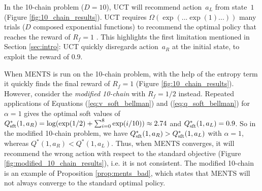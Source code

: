 \documentclass{article}
\newcommand{\Qss}[2]{Q^*_{\textnormal{sft}}(#1,#2)}
\theoremstyle{plain}
\begin{document}
	In the 10-chain problem ($D=10$), UCT will recommend action~$a_L$ from state~$1$ (Figure \ref{fig:10_chain_results}). UCT requires $\Omega(\exp(...\exp(1)...))$ many trials ($D$ composed exponential functions) to recommend the optimal policy that reaches the reward of $R_f=1$ \cite{coquelin2007_uct}. This highlights the first limitation mentioned in Section \ref{sec:intro}: UCT quickly disregards action~$a_R$ at the initial state, to exploit the reward of $0.9$.%

    When MENTS is run on the 10-chain problem, with the help of the entropy term it quickly finds the final reward of $R_f=1$ %
    (Figure \ref{fig:10_chain_results}). However, consider the \textit{modified 10-chain} with $R_f=1/2$ instead. Repeated applications of Equations (\ref{eq:v_soft_bellman}) and (\ref{eq:q_soft_bellman}) for $\alpha=1$ gives the optimal soft values of $\Qss{1}{a_R}=\log(\exp(1/2)+\sum_{i=0}^8\exp(i/10))\approx 2.74$ and $\Qss{1}{a_L}=0.9$. So in the modified 10-chain problem, we have $\Qss{1}{a_R}>\Qss{1}{a_L}$ with $\alpha=1$, whereas $Q^*(1,a_R)<Q^*(1,a_L)$. Thus, when MENTS converges, %
    it will recommend the wrong action with respect to the standard %
    objective (Figure \ref{fig:modified_10_chain_results}), i.e. it is not consistent. The modified 10-chain is an example of Proposition \ref{prop:ments_bad}, which states that MENTS will not always converge to the standard optimal policy.
    
\end{document}
